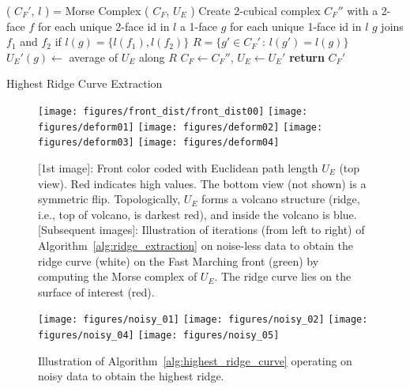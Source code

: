 \documentclass[10pt,journal,compsoc]{IEEEtran}
\begin{document}
\begin{algorithm}
  \begin{algorithmic}[1]
    \State {}
    \State {}
    \Repeat
    \State ( $C_F'$, $l$ ) = {\sc Morse Complex} ( $C_F$, $U_E$ )
    \State Create 2-cubical complex $C_F''$ with 
    \State \indent a 2-face $f$ for each unique 2-face id in $l$
    \State \indent a 1-face $g$ for each unique 1-face id in $l$
    \State \indent $g$ joins $f_1$ and $f_2$ if $l(g) = \{ l(f_1),  l(f_2) \}$
    \State $R = \{ g' \in C_F' \,:\, l(g') = l(g) \}$ 
    \State $U_E'(g) \gets$ average of $U_E$ along $R$
    \EndFor
    \State $C_F \gets C_F''$, $U_E \gets U_E'$
    \State \textbf{return} $C_F'$
    \EndProcedure
  \end{algorithmic}
  \caption{Highest Ridge Curve Extraction}
  \label{alg:highest_ridge_curve}
\end{algorithm}

\def\fHeightDeform{0.48in}
\begin{figure}
  \centering
  {\scriptsize
    \texttt{[image: figures/front\_dist/front\_dist00]}
    \texttt{[image: figures/deform01]}
    \texttt{[image: figures/deform02]}
    \texttt{[image: figures/deform03]}
    \texttt{[image: figures/deform04]}
  }
  \caption{ [1st image]: Front color coded with Euclidean path length
    $U_E$ (top view). Red indicates high values. The bottom view (not
    shown) is a symmetric flip. Topologically, $U_E$ forms a volcano
    structure (ridge, i.e., top of volcano, is darkest red), and
    inside the volcano is blue. [Subsequent images]: Illustration of
    iterations (from left to right) of
    Algorithm~\ref{alg:ridge_extraction} on noise-less data to obtain
    the ridge curve (white) on the Fast Marching front (green) by
    computing the Morse complex of $U_E$. The ridge curve lies on the
    surface of interest (red).}
  \label{fig:ridge_curve_extraction}
\end{figure}

\def\fHeightNoisy{0.77in}
\begin{figure}
  \centering
  {\scriptsize
    \texttt{[image: figures/noisy\_01]}
    \texttt{[image: figures/noisy\_02]}
    \texttt{[image: figures/noisy\_04]}
    \texttt{[image: figures/noisy\_05]}
  }
  \caption{Illustration of Algorithm~\ref{alg:highest_ridge_curve}
    operating on noisy data to obtain the highest ridge.}
  \label{fig:noisy_example}
\end{figure}
\end{document}
